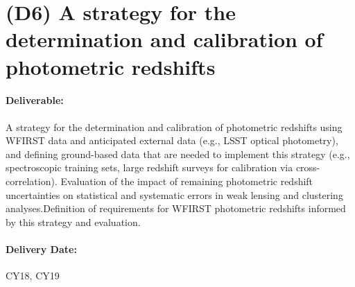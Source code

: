 \section*{(D6) A strategy for the determination and calibration of photometric redshifts}

\paragraph*{Deliverable:} A strategy for the determination and calibration of
photometric redshifts using WFIRST data and anticipated external data (e.g.,
LSST optical photometry), and defining ground-based data that are needed to
implement this strategy (e.g., spectroscopic training sets, large redshift
surveys for calibration via cross-correlation). Evaluation of the impact of
remaining photometric redshift uncertainties on statistical and systematic
errors in weak lensing and clustering analyses.Definition of requirements for
WFIRST photometric redshifts informed by this strategy and evaluation.

\paragraph*{Delivery Date:} CY18, CY19

